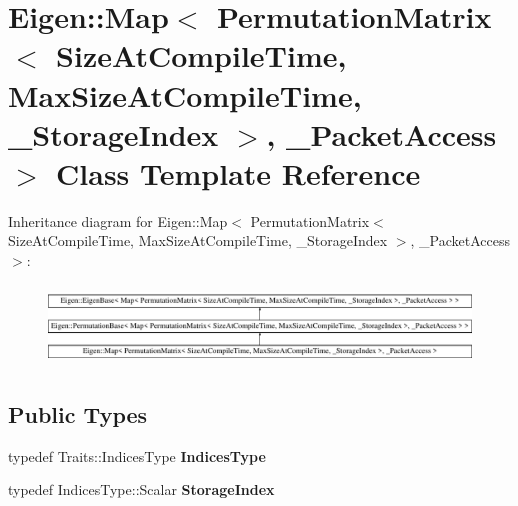 \hypertarget{class_eigen_1_1_map_3_01_permutation_matrix_3_01_size_at_compile_time_00_01_max_size_at_compile_2f9d18bf0084dbfb13fbbfe14adaf22d}{}\section{Eigen\+::Map$<$ Permutation\+Matrix$<$ Size\+At\+Compile\+Time, Max\+Size\+At\+Compile\+Time, \+\_\+\+Storage\+Index $>$, \+\_\+\+Packet\+Access $>$ Class Template Reference}
\label{class_eigen_1_1_map_3_01_permutation_matrix_3_01_size_at_compile_time_00_01_max_size_at_compile_2f9d18bf0084dbfb13fbbfe14adaf22d}
Inheritance diagram for Eigen\+::Map$<$ Permutation\+Matrix$<$ Size\+At\+Compile\+Time, Max\+Size\+At\+Compile\+Time, \+\_\+\+Storage\+Index $>$, \+\_\+\+Packet\+Access $>$\+:\begin{figure}[H]
\begin{center}
\leavevmode
\includegraphics[height=2.145594cm]{class_eigen_1_1_map_3_01_permutation_matrix_3_01_size_at_compile_time_00_01_max_size_at_compile_2f9d18bf0084dbfb13fbbfe14adaf22d}
\end{center}
\end{figure}
\subsection*{Public Types}
\begin{DoxyCompactItemize}
\item 
\mbox{\label{class_eigen_1_1_map_3_01_permutation_matrix_3_01_size_at_compile_time_00_01_max_size_at_compile_2f9d18bf0084dbfb13fbbfe14adaf22d_a1809effab1afe64d00ff33a65de23cdb}} 
typedef Traits\+::\+Indices\+Type {\bfseries Indices\+Type}
\item 
\mbox{\label{class_eigen_1_1_map_3_01_permutation_matrix_3_01_size_at_compile_time_00_01_max_size_at_compile_2f9d18bf0084dbfb13fbbfe14adaf22d_ac1e93b21af3f16b5694e0b125a7ec003}} 
typedef Indices\+Type\+::\+Scalar {\bfseries Storage\+Index}
\end{DoxyCompactItemize}
